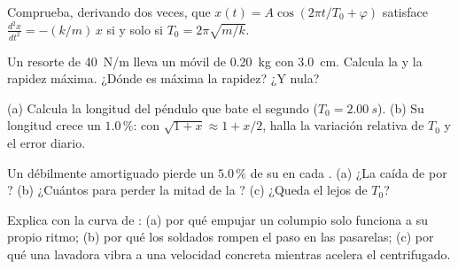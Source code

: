 \begin{exercise}[$\star\star$]\label{exo:g12:oscillators-and-time:7}
Comprueba, derivando dos veces, que $x(t) = A\cos(2\pi t/T_0 + \varphi)$ satisface
$\frac{d^2x}{dt^2} = -(k/m)\,x$ si y solo si $T_0 = 2\pi\sqrt{m/k}$.
\end{exercise}

\begin{exercise}[$\star\star$]\label{exo:g12:oscillators-and-time:8}
Un resorte de  \qty{40}{N/m} lleva un móvil de \qty{0.20}{kg} con
 \qty{3.0}{cm}. Calcula la  y la rapidez máxima. ¿Dónde es
máxima la rapidez? ¿Y nula?
\end{exercise}

\begin{exercise}[$\star\star$]\label{exo:g12:oscillators-and-time:9}
(a) Calcula la longitud del péndulo que bate el segundo ($T_0 = \qty{2.00}{s}$).
(b) Su longitud crece un $1.0\,\%$: con $\sqrt{1+x} \approx 1 + x/2$, halla la
variación relativa de $T_0$ y el error diario.
\end{exercise}

\begin{exercise}[$\star\star$]\label{exo:g12:oscillators-and-time:10}
Un  débilmente amortiguado pierde un $5.0\,\%$ de su  en cada .
(a) ¿La caída de  por ? (b) ¿Cuántos  para perder la mitad de
la ? (c) ¿Queda el  lejos de $T_0$?
\end{exercise}

\begin{exercise}[$\star\star$]\label{exo:g12:oscillators-and-time:11}
Explica con la curva de : (a) por qué empujar un columpio solo funciona a su
propio ritmo; (b) por qué los soldados rompen el paso en las pasarelas; (c) por qué
una lavadora vibra a una velocidad concreta mientras acelera el centrifugado.
\end{exercise}

